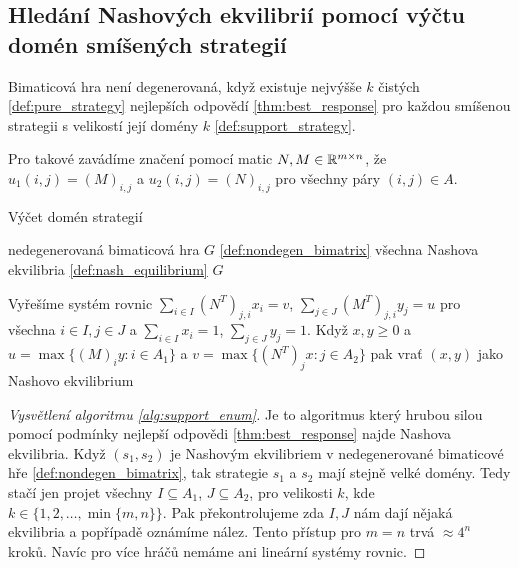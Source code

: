 \subsection{Hledání Nashových ekvilibrií pomocí výčtu domén smíšených strategií}
\begin{definition}
\label{def:nondegen_bimatrix}
Bimaticová hra není degenerovaná, když existuje nejvýšše $k$ čistých \ref{def:pure_strategy} nejlepších odpovědí \ref{thm:best_response} pro každou smíšenou strategii s velikostí její domény $k$ \ref{def:support_strategy}.

Pro takové zavádíme značení pomocí matic $N,M \in \mathbb{R}^{m\times n}$, že $u_1(i,j) = (M)_{i,j}$ a $u_2(i,j) = (N)_{i,j}$ pro všechny páry $(i,j) \in A$.
\end{definition}
\begin{algorithm}
    \algrenewcommand{}
    \algrenewcommand{}
    \caption{Výčet domén strategií}
    \label{alg:support_enum}
    \begin{algorithmic}[1]
        \Require  nedegenerovaná bimaticová hra $G$ \ref{def:nondegen_bimatrix}
        \Ensure  všechna Nashova ekvilibria \ref{def:nash_equilibrium} $G$
        
            \State Vyřešíme systém rovnic $\sum_{i\in I} (N^T)_{j,i} x_i = v$, $\sum_{j\in J} (M^T)_{j,i} y_j = u$ pro všechna $i\in I, j\in J$ a $\sum_{i \in I} x_i = 1$, $\sum_{j \in J} y_j = 1$.
            \State Když $x,y\geq 0$ a $u = \max\{(M)_{i}y: i \in A_1\}$ a $v = \max\{(N^T)_{j}x: j \in A_2\}$ pak vrať $(x,y)$ jako Nashovo ekvilibrium
        \EndFor
    \end{algorithmic}
\end{algorithm}

\begin{proof}[Vysvětlení algoritmu \ref{alg:support_enum}]
    Je to algoritmus který hrubou silou pomocí podmínky nejlepší odpovědi \ref{thm:best_response} najde Nashova ekvilibria. 
Když $(s_1,s_2)$ je Nashovým ekvilibriem v nedegenerované bimaticové hře \ref{def:nondegen_bimatrix}, tak strategie $s_1$ a $s_2$ mají stejně velké domény. 
Tedy stačí jen projet všechny $I\subseteq A_1$, $J \subseteq A_2$, pro velikosti $k$, kde $k \in \{1,2,\dots, \min\{m,n\}\}$. 
Pak překontrolujeme zda $I,J$ nám dají nějaká ekvilibria a popřípadě oznámíme nález. 
Tento přístup pro $m = n$ trvá $\approx 4^n$ kroků. 
Navíc pro více hráčů nemáme ani lineární systémy rovnic. 
\end{proof}


